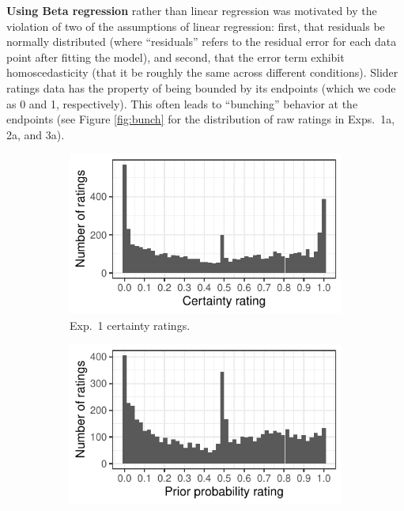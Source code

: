 \documentclass[11pt,fleqn]{article}
\newcommand{\6}{\mbox{$[\hspace*{-.6mm}[$}}
\newcommand{\9}{\mbox{$]\hspace*{-.6mm}]$}}
\begin{document}
\textbf{Using Beta regression} rather than linear regression was motivated by the violation of two of the  assumptions of linear regression: first, that residuals be normally distributed (where ``residuals'' refers to the residual error for each data point after fitting the model), and second, that the error term exhibit homoscedasticity (that it be roughly the same across different conditions). Slider ratings data has the property of being bounded by its endpoints (which we code as 0 and 1, respectively). This often leads to ``bunching'' behavior at the endpoints (see Figure \ref{fig:bunch} for the distribution of raw ratings in Exps.~1a, 2a, and 3a). 


\begin{figure}[h!]
\begin{subfigure}{.33\textwidth}
\includegraphics[width=\textwidth]{../../results/9-prior-projection/graphs/bunching-projection}
\caption{Exp.~1 certainty ratings.}
\label{fig:exp1araw}
\end{subfigure}
\begin{subfigure}{.33\textwidth}
\includegraphics[width=\textwidth]{../../results/9-prior-projection/graphs/bunching-prior}

\end{subfigure}
\end{figure}
\end{document}
